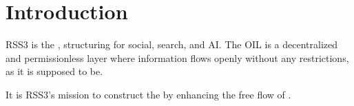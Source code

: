 \section{Introduction}

RSS3 is the , structuring  for social, search, and AI.
The \gls{OIL} is a decentralized and permissionless layer where information flows openly without any restrictions, as it is supposed to be.

It is RSS3's mission to construct the  by enhancing the free flow of .

